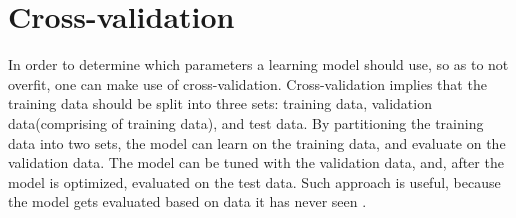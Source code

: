 \section{Cross-validation}
In order to determine which parameters a learning model should use, so as to not overfit, one can make use of cross-validation. Cross-validation implies that the training data should be split into three sets: training data, validation data(comprising of training data), and test data. By partitioning the training data into two sets, the model can learn on the training data, and evaluate on the validation data. The model can be tuned with the validation data, and, after the model is optimized, evaluated on the test data. Such approach is useful, because the model gets evaluated based on data it has never seen \cite{scikit-learn}.







